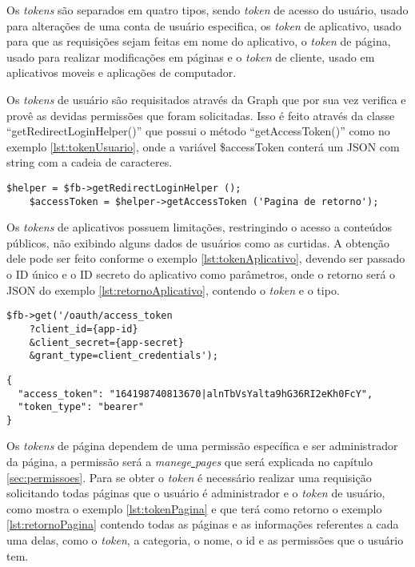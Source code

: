 Os \textit{tokens} são separados em quatro tipos, sendo \textit{token} de acesso do usuário, usado para alterações de uma conta de usuário especifica, os  \textit{token} de aplicativo, usado para que as requisições sejam feitas em nome do aplicativo, o \textit{token} de página, usado para realizar modificações em páginas e o \textit{token} de cliente, usado em aplicativos moveis e aplicações de computador.

Os \textit{tokens} de usuário são requisitados através da Graph que por sua vez verifica e provê as devidas permissões que foram solicitadas. Isso é feito através da classe ``getRedirectLoginHelper()'' que possui o método ``getAccessToken()'' como no exemplo \ref{lst:tokenUsuario}, onde a variável \$accessToken conterá um JSON com string com a cadeia de caracteres. 

\begin{lstlisting}[caption={Obtendo Token de acesso a página},label={lst:tokenUsuario}]
	$helper = $fb->getRedirectLoginHelper ();
	$accessToken = $helper->getAccessToken ('Pagina de retorno');
\end{lstlisting}

Os \textit{tokens} de aplicativos possuem limitações, restringindo o acesso a conteúdos públicos, não exibindo alguns dados de usuários como as curtidas. A obtenção dele pode ser feito conforme o exemplo \ref{lst:tokenAplicativo}, devendo ser passado o ID único e o ID secreto do aplicativo como parâmetros, onde o retorno será o JSON do exemplo \ref{lst:retornoAplicativo}, contendo o \textit{token} e o tipo.

\begin{lstlisting}[caption={Obtendo \textit{token} de acesso de aplicativos},label={lst:tokenAplicativo}]
$fb->get('/oauth/access_token
    ?client_id={app-id}
    &client_secret={app-secret}
    &grant_type=client_credentials');
\end{lstlisting}

\begin{lstlisting}[caption={Retorno \textit{token} de acesso de aplicativo \ref{lst:tokenAplicativo}},label={lst:retornoAplicativo}]
{
  "access_token": "164198740813670|alnTbVsYalta9hG36RI2eKh0FcY",
  "token_type": "bearer"
}
\end{lstlisting}

Os \textit{tokens} de página dependem de uma permissão específica e ser administrador da página, a permissão será a \textit{manege\underline{{ }}pages} que será explicada no capítulo \ref{sec:permissoes}. Para se obter o \textit{token} é necessário realizar uma requisição solicitando todas páginas que o usuário é administrador e o \textit{token} de usuário, como mostra o exemplo \ref{lst:tokenPagina} e que terá como retorno o exemplo \ref{lst:retornoPagina} contendo todas as páginas e as informações referentes a cada uma delas, como o \textit{token}, a categoria, o nome, o id e as permissões que o usuário tem. 

